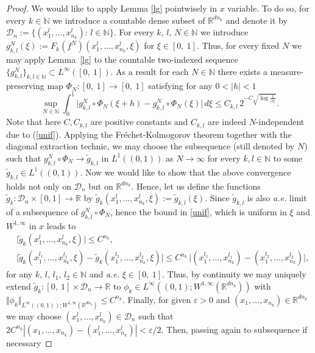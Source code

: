 \documentclass[10pt]{article}
\newcommand*{\abs}[1]{\left\vert{#1}\right\vert}
\newcommand{\ve}{\varepsilon}
\newcommand{\R}{\mathbb{R}}
\begin{document}
\begin{proof}
We would like to apply Lemma \ref{lg} pointwisely in $x$ variable. To do so, for every $k\in \mathbb{N}$ we introduce a countable dense subset of $\mathbb{R}^{dn_k}$
and denote it by $\mathcal{D}_n:=\{(x_1^l,\dots,x_{n_k}^l):\,l\in \mathbb{N}\}$. For every $k,\,l,\,N\in \mathbb{N}$ we introduce $g_{k,l}^N(\xi):=F_k(f^N)(x_1^l,\ldots,x_{n_k}^l,\xi)$ for $\xi\in [0,\ 1]$. Thus, for every fixed $N$ we may apply Lemma~\ref{lg} to the countable two-indexed sequence $\{g_{k,l}^N\}_{k,l\in \mathbb{N}}\subset L^\infty([0,\ 1])$. As a result for each $N\in \mathbb{N}$ there exists a measure-preserving map $\Phi_N:[0,\ 1]\longrightarrow [0,\ 1]$ satisfying for any $0<|h|<1$
\[
\sup_{N\in \mathbb{N}}\int_0^1 \vert  g_{k,l} ^N\circ \Phi_N(\xi+h) -g_{k,l} ^N\circ \Phi_N(\xi)\vert \,d\xi\leq C_{k,l}\,2^{-C\sqrt{\log \frac{1}{|h|}}}.
\]
Note that here $C,C_{k,l}$ are positive constants and  $C_{k,l}$ are indeed $N$-independent due to (\ref{unif}). Applying the Fr\'echet-Kolmogorov theorem together with the diagonal extraction technic, we may choose the subsequence  (still denoted by $N$) such that $ g_{k,l}^N\circ\Phi_N\rightarrow \tilde g_{k,l}$ in $L^1((0, 1))$ as $N\rightarrow \infty$ for every $k,l\in \mathbb{N}$ to some $\tilde g_{k,l}\in L^1((0, 1))$. Now we would like to show that the above convergence holds not only on $\mathcal{D}_n$ but on $\mathbb{R}^{dn_k}$. Hence, let us define the functions $\tilde g_k: \mathcal{D}_n \times [0,1]\longrightarrow \mathbb{R}$ by $\tilde g_k(x_1^l,\ldots,x_{n_k}^l,\xi):=\tilde g_{k,l} (\xi)$. Since $\tilde g_{k,l}$ is also {\em a.e.} limit of a  subsequence of $g_{k,l}^N\circ\Phi_N$, hence the bound in \eqref{unif}, which is uniform in $\xi$ and $W^{1,\infty}$ in $x$ leads to
\begin{align*}
&\vert \tilde g_k(x_1^l,\ldots,x_{n_k}^l,\xi)\vert \leq C^{n_k},\\
&\vert \tilde g_k(x_1^{l_1},\dots,x_{n_k}^{l_1},\xi)-\tilde g_k(x_1^{l_2},\ldots,x_{n_k}^{l_2},\xi)\vert \leq C^{n_k}\,\vert (x_1^{l_1},\ldots,x_{n_k}^{l_1})-(x_1^{l_2},\ldots,x_{n_k}^{l_2})\vert,
\end{align*}
for any $k,\,l,\,l_1,\,l_2\in \mathbb{N}$ and {\em a.e.} $\xi\in [0,\ 1]$. Thus, by continuity we may uniquely extend $\tilde g_k:[0,\ 1]\times \mathcal{D}_n\rightarrow \mathbb{R}$ to $\phi_k\in L^\infty((0,1); W^{1,\infty}(\R^{dn_k}))$ with $\Vert \phi_k\Vert_{L^\infty((0,1)); W^{1,\infty}(\R^{dn_k})}\leq C^{n_k}$. Finally, for given $\ve > 0$ and $(x_1,\dots,x_{n_k})\in \R^{dn_k}$ we may choose $(x_1^l,\dots,x_{n_k}^l) \in \mathcal{D}_n$ such that $2C^{n_k} \abs{(x_1,\dots,x_{n_k}) - (x_1^l,\dots,x_{n_k}^l)} < \ve/2$. Then, passing again to subsequence if necessary

\end{proof}
\end{document}
